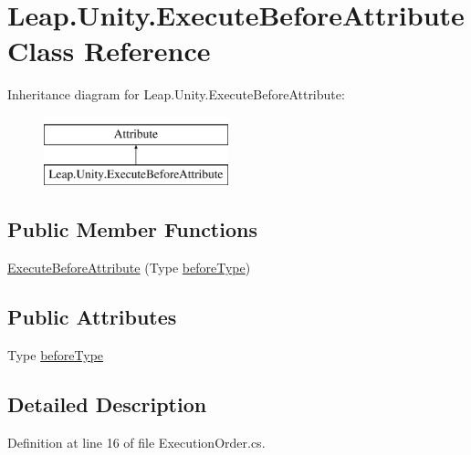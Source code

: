 \hypertarget{class_leap_1_1_unity_1_1_execute_before_attribute}{}\section{Leap.\+Unity.\+Execute\+Before\+Attribute Class Reference}
\label{class_leap_1_1_unity_1_1_execute_before_attribute}
Inheritance diagram for Leap.\+Unity.\+Execute\+Before\+Attribute\+:\begin{figure}[H]
\begin{center}
\leavevmode
\includegraphics[height=2.000000cm]{class_leap_1_1_unity_1_1_execute_before_attribute}
\end{center}
\end{figure}
\subsection*{Public Member Functions}
\begin{DoxyCompactItemize}
\item 
\mbox{\hyperlink{class_leap_1_1_unity_1_1_execute_before_attribute_afa564cc4ceb7b0896b1079ce1b7e9d93}{Execute\+Before\+Attribute}} (Type \mbox{\hyperlink{class_leap_1_1_unity_1_1_execute_before_attribute_aea1b9b60c1c301e7878a7bfbc215beac}{before\+Type}})
\end{DoxyCompactItemize}
\subsection*{Public Attributes}
\begin{DoxyCompactItemize}
\item 
Type \mbox{\hyperlink{class_leap_1_1_unity_1_1_execute_before_attribute_aea1b9b60c1c301e7878a7bfbc215beac}{before\+Type}}
\end{DoxyCompactItemize}


\subsection{Detailed Description}


Definition at line 16 of file Execution\+Order.\+cs.




